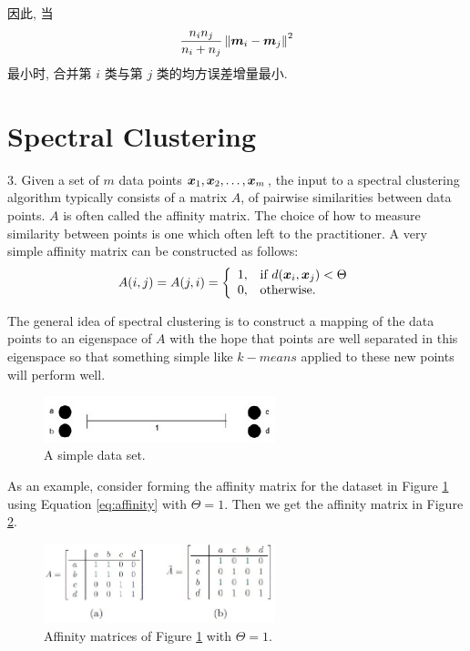 \documentclass{article}
\begin{document}
因此, 当
\begin{equation}
  \frac{n_i n_j}{n_i+n_j}\left\|\bm{m}_i-\bm{m}_j\right\|^2
\end{equation}
最小时, 合并第 $i$ 类与第 $j$ 类的均方误差增量最小.

\section*{Spectral Clustering}

3. Given a set of $m$ data points $\bm{x}_1,\bm{x}_2,\dots, \bm{x}_m$, the input to a spectral clustering algorithm typically consists of a matrix $A$, of pairwise similarities between data points. $A$ is often called the affinity matrix. The choice of how to measure similarity between points is one which often left to the practitioner. A very simple affinity matrix can be constructed as follows:
\begin{equation}
  A(i,j)=A(j,i)=\left\{ 
    \begin{array}{ll}
      1, & \text{if}~d(\bm{x}_{i}, \bm{x}_{j})<\Theta \\
      0, & \text{otherwise.} \\
    \end{array} \right.
  \label{eq:affinity}
\end{equation}

The general idea of spectral clustering is to construct a mapping of the data points to an eigenspace of $A$ with the hope that points are well separated in this eigenspace so that something simple like $k-means$ applied to these new points will perform well.
\begin{figure}[ht]
  \centering
  \includegraphics[width=0.6\textwidth]{simple_dataset.jpg}
  \caption{A simple data set.} 
  \label{fig:f1}
\end{figure}

As an example, consider forming the affinity matrix for the dataset in Figure \ref{fig:f1} using Equation \ref{eq:affinity} with $\Theta=1$. Then we get the affinity matrix in Figure \ref{fig:f2}.
\begin{figure}[ht]
  \centering
  \includegraphics[width=0.6\textwidth]{matrices.jpg}
  \caption{Affinity matrices of Figure \ref{fig:f1} with $\Theta=1$.} 
  \label{fig:f2}
\end{figure}
\end{document}
